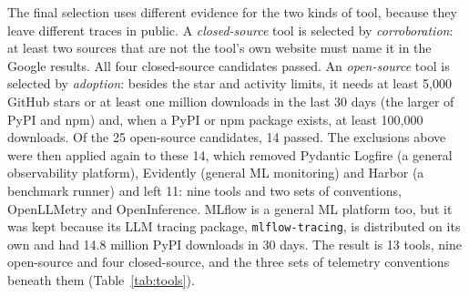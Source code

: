 \documentclass[conference]{IEEEtran}
\begin{document}

The final selection uses different evidence for the two kinds of tool, because they leave different traces in public. A \emph{closed-source} tool is selected by \emph{corroboration}: at least two sources that are not the tool's own website must name it in the Google results. All four closed-source candidates passed. An \emph{open-source} tool is selected by \emph{adoption}: besides the star and activity limits, it needs at least 5,000 GitHub stars or at least one million downloads in the last 30 days (the larger of PyPI and npm) and, when a PyPI or npm package exists, at least 100,000 downloads. Of the 25 open-source candidates, 14 passed. The exclusions above were then applied again to these 14, which removed Pydantic Logfire (a general observability platform), Evidently (general ML monitoring) and Harbor (a benchmark runner) and left 11: nine tools and two sets of conventions, OpenLLMetry and OpenInference. MLflow is a general ML platform too, but it was kept because its LLM tracing package, \texttt{mlflow-tracing}, is distributed on its own and had 14.8 million PyPI downloads in 30 days. The result is 13 tools, nine open-source and four closed-source, and the three sets of telemetry conventions beneath them (Table~\ref{tab:tools}).
\end{document}

